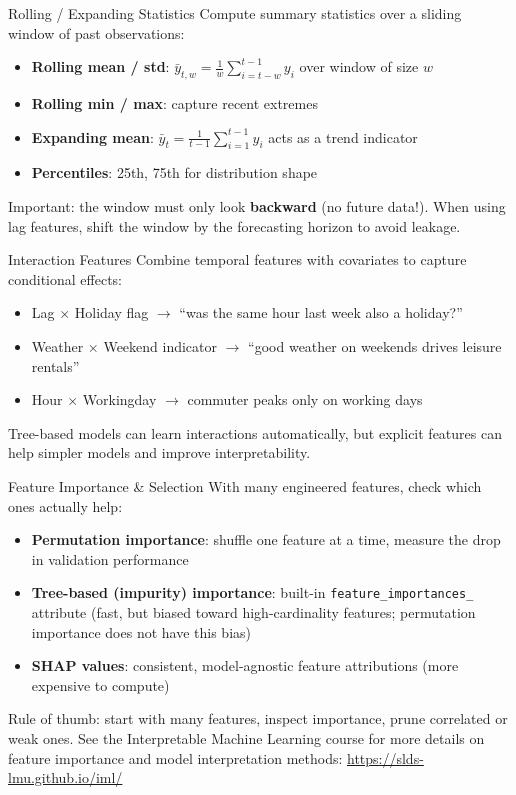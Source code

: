 \documentclass[11pt,compress,t,notes=noshow, xcolor=table]{beamer}
\begin{document}
\begin{vbframe}{Rolling / Expanding Statistics}
  \vfill
  Compute summary statistics over a sliding window of past observations:
  \begin{itemize}
    \item \textbf{Rolling mean / std}: $\bar{y}_{t,w} = \frac{1}{w}\sum_{i=t-w}^{t-1} y_i$ over window of size $w$
    \item \textbf{Rolling min / max}: capture recent extremes
    \item \textbf{Expanding mean}: $\bar{y}_{t} = \frac{1}{t-1}\sum_{i=1}^{t-1} y_i$ acts as a trend indicator
    \item \textbf{Percentiles}: 25th, 75th for distribution shape
  \end{itemize}
  \vfill
  Important: the window must only look \textbf{backward} (no future data!). When using lag features, shift the window by the forecasting horizon to avoid leakage.
  \vfill
\end{vbframe}

\begin{vbframe}{Interaction Features}
  \vfill
  Combine temporal features with covariates to capture conditional effects:
  \begin{itemize}
    \item Lag $\times$ Holiday flag $\rightarrow$ ``was the same hour last week also a holiday?''
    \item Weather $\times$ Weekend indicator $\rightarrow$ ``good weather on weekends drives leisure rentals''
    \item Hour $\times$ Workingday $\rightarrow$ commuter peaks only on working days
  \end{itemize}
  \vfill
  Tree-based models can learn interactions automatically, but explicit features can help simpler models and improve interpretability.
  \vfill
\end{vbframe}

\begin{vbframe}{Feature Importance \& Selection}
\vfill
With many engineered features, check which ones actually help:
\vfill
\begin{itemize}
    \item \textbf{Permutation importance}: shuffle one feature at a time, measure the drop in validation performance
    \item \textbf{Tree-based (impurity) importance}: built-in \texttt{feature\_importances\_} attribute (fast, but biased toward high-cardinality features; permutation importance does not have this bias)
    \item \textbf{SHAP values}: consistent, model-agnostic feature attributions (more expensive to compute)
\end{itemize}
\vfill
Rule of thumb: start with many features, inspect importance, prune correlated or weak ones.
\vfill
See the Interpretable Machine Learning course for more details on feature importance and model interpretation methods: \url{https://slds-lmu.github.io/iml/}
\vfill
\end{vbframe}
\end{document}

